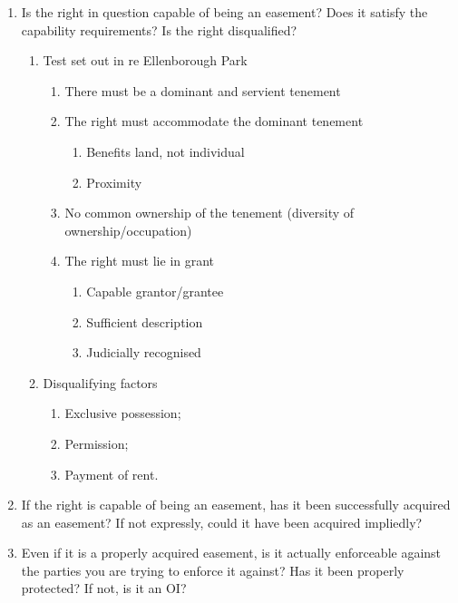 \documentclass[
]{article}
\providecommand{\tightlist}{%
  \setlength{\itemsep}{0pt}\setlength{\parskip}{0pt}}
\begin{document}
\begin{enumerate}
\tightlist
\item
  Is the right in question capable of being an easement? Does it satisfy
  the capability requirements? Is the right disqualified?

  \begin{enumerate}
  \tightlist
  \item
    Test set out in re Ellenborough Park

    \begin{enumerate}
    \tightlist
    \item
      There must be a dominant and servient tenement
    \item
      The right must accommodate the dominant tenement

      \begin{enumerate}
      \tightlist
      \item
        Benefits land, not individual
      \item
        Proximity
      \end{enumerate}
    \item
      No common ownership of the tenement (diversity of
      ownership/occupation)
    \item
      The right must lie in grant

      \begin{enumerate}
      \tightlist
      \item
        Capable grantor/grantee
      \item
        Sufficient description
      \item
        Judicially recognised
      \end{enumerate}
    \end{enumerate}
  \item
    Disqualifying factors

    \begin{enumerate}
    \tightlist
    \item
      Exclusive possession;
    \item
      Permission;
    \item
      Payment of rent.
    \end{enumerate}
  \end{enumerate}
\item
  If the right is capable of being an easement, has it been successfully
  acquired as an easement? If not expressly, could it have been acquired
  impliedly?
\item
  Even if it is a properly acquired easement, is it actually enforceable
  against the parties you are trying to enforce it against? Has it been
  properly protected? If not, is it an OI?
\end{enumerate}
\end{document}
